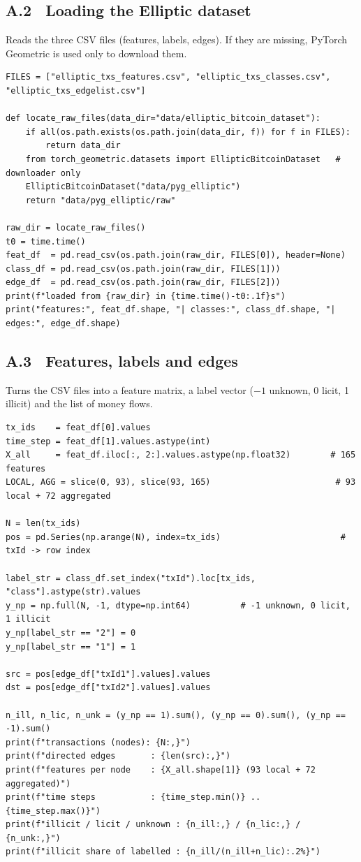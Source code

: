 \subsection*{A.2 \ Loading the Elliptic dataset}
Reads the three CSV files (features, labels, edges). If they are missing, PyTorch Geometric is used only to download them.
\begin{lstlisting}
FILES = ["elliptic_txs_features.csv", "elliptic_txs_classes.csv", "elliptic_txs_edgelist.csv"]

def locate_raw_files(data_dir="data/elliptic_bitcoin_dataset"):
    if all(os.path.exists(os.path.join(data_dir, f)) for f in FILES):
        return data_dir
    from torch_geometric.datasets import EllipticBitcoinDataset   # downloader only
    EllipticBitcoinDataset("data/pyg_elliptic")
    return "data/pyg_elliptic/raw"

raw_dir = locate_raw_files()
t0 = time.time()
feat_df  = pd.read_csv(os.path.join(raw_dir, FILES[0]), header=None)
class_df = pd.read_csv(os.path.join(raw_dir, FILES[1]))
edge_df  = pd.read_csv(os.path.join(raw_dir, FILES[2]))
print(f"loaded from {raw_dir} in {time.time()-t0:.1f}s")
print("features:", feat_df.shape, "| classes:", class_df.shape, "| edges:", edge_df.shape)
\end{lstlisting}

\subsection*{A.3 \ Features, labels and edges}
Turns the CSV files into a feature matrix, a label vector ($-1$ unknown, 0 licit, 1 illicit) and the list of money flows.
\begin{lstlisting}
tx_ids    = feat_df[0].values
time_step = feat_df[1].values.astype(int)
X_all     = feat_df.iloc[:, 2:].values.astype(np.float32)        # 165 features
LOCAL, AGG = slice(0, 93), slice(93, 165)                         # 93 local + 72 aggregated

N = len(tx_ids)
pos = pd.Series(np.arange(N), index=tx_ids)                        # txId -> row index

label_str = class_df.set_index("txId").loc[tx_ids, "class"].astype(str).values
y_np = np.full(N, -1, dtype=np.int64)          # -1 unknown, 0 licit, 1 illicit
y_np[label_str == "2"] = 0
y_np[label_str == "1"] = 1

src = pos[edge_df["txId1"].values].values
dst = pos[edge_df["txId2"].values].values

n_ill, n_lic, n_unk = (y_np == 1).sum(), (y_np == 0).sum(), (y_np == -1).sum()
print(f"transactions (nodes): {N:,}")
print(f"directed edges       : {len(src):,}")
print(f"features per node    : {X_all.shape[1]} (93 local + 72 aggregated)")
print(f"time steps           : {time_step.min()} .. {time_step.max()}")
print(f"illicit / licit / unknown : {n_ill:,} / {n_lic:,} / {n_unk:,}")
print(f"illicit share of labelled : {n_ill/(n_ill+n_lic):.2%}")
\end{lstlisting}

